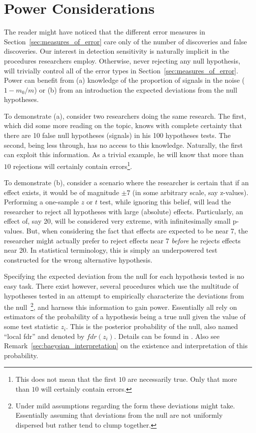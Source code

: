 \documentclass[review,12pt]{article}
\theoremstyle{definition}
\theoremstyle{definition}
\begin{document}
\section{\label{sec:power}Power Considerations}

The reader might have noticed that the different error measures in Section~\ref{sec:measures_of_error} care only of the number of discoveries and false discoveries. Our interest in detection sensitivity is naturally implicit in the procedures researchers employ. Otherwise, never rejecting any null hypothesis, will trivially control all of the error types in Section~\ref{sec:measures_of_error}. 
Power can benefit from (a) knowledge of the proportion of signals in the noise ($ 1 - m_0 / m $) or (b) from an introduction the expected deviations from the null hypotheses. 

To demonstrate (a), consider two researchers doing the same research. The first, which did some more reading on the topic, knows with complete certainty that there are 10 false null hypotheses (signals) in his 100 hypotheses tests. The second, being less through, has no access to this knowledge. 
Naturally, the first can exploit this information. As a trivial example, he will know that  more than $10$ rejections will certainly contain errors\footnote{ This does not mean that the first $10$ are necessarily true. Only that more than $10$ will certainly contain errors.}. 

To demonstrate (b), consider a scenario where the researcher is certain that if an effect exists, it would be of magnitude $\pm 7$ (in some arbitrary scale, say z-values). Performing a one-sample $z$ or $t$ test, while ignoring this belief, will lead the researcher to reject all hypotheses with large (absolute) effects. Particularly, an effect of, say 20,  will be considered very extreme, with infinitesimally small p-values. But, when considering the fact that effects are expected to be near 7, the researcher might actually prefer to reject effects near 7 \emph{before} he rejects effects near 20. In  statistical terminology, this is simply an underpowered test constructed for the wrong alternative hypothesis. 

Specifying the expected deviation from the null for each hypothesis tested is no easy task. There exist however, several procedures which use the multitude of hypotheses tested in an attempt to empirically characterize the deviations from the null~\footnote{ Under mild assumptions regarding the form these deviations might take. Essentially assuming that deviations from the null are not uniformly dispersed but rather tend to clump together.}, and harness this information to gain power. 
Essentially all rely on estimators of the probability of a hypothesis being a true null given the value of some test statistic $z_i$. This is the posterior probability of the null, also named ``local fdr'' and denoted by $fdr(z_i)$. Details can be found in \cite{efron_microarrays_2008}. Also see Remark~\ref{sec:baeysian_interpretation} on the existence and interpretation of this probability.
\end{document}
